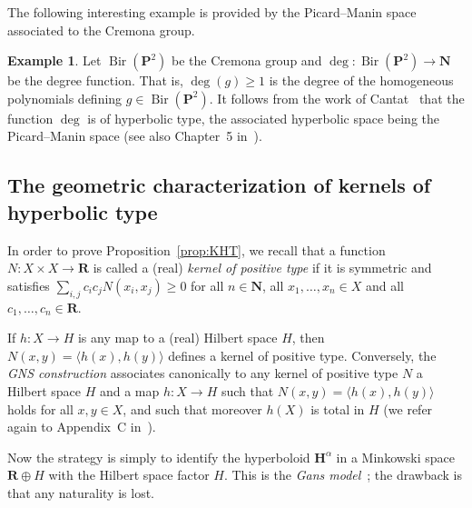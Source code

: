 \documentclass[11pt]{article}
\theoremstyle{definition}
\newtheorem{exam}[theo]{Example}
\numberwithin{equation}{section}
\numberwithin{figure}{section}
\numberwithin{table}{section}
\DeclareMathOperator{\Bir}{Bir}
\newcommand{\sH}{H}
\newcommand{\RR}{\mathbf{R}}
\newcommand{\NN}{\mathbf{N}}
\newcommand{\HH}{\mathbf{H}}
\begin{document}
The following interesting example is provided by the Picard--Manin space associated to the Cremona group.

\begin{exam}\label{ex:PM}
Let $\Bir(\mathbf{P}^{2})$ be the Cremona group and $\deg \colon \Bir(\mathbf{P}^{2}) \to \mathbf{N}$ be the degree function. That is, $\deg(g)\geq 1$ is the degree of the homogeneous polynomials defining $g\in \Bir(\mathbf{P}^{2})$. It follows from the work of Cantat~\cite{Cantat} that the function $\deg$ is of hyperbolic type, the associated hyperbolic space being the Picard--Manin space (see also Chapter~5 in~\cite{Manin}).
\end{exam}


\subsection{The geometric characterization of kernels of hyperbolic type}\label{sec:KHT-KPT}

In order to prove Proposition~\ref{prop:KHT}, we recall that a function $N\colon X\times X\to\RR$ is called a (real) \emph{kernel of positive type} if it is symmetric and satisfies $\sum_{i,j} c_i c_j N(x_i, x_j)\geq 0$ for all $n\in \NN$, all $x_1, \ldots, x_n\in X$ and all $c_1, \ldots, c_n\in \RR$.

If $h\colon X\to \sH$ is any map to a (real) Hilbert space $\sH$, then $N(x,y)=\langle h(x), h(y)\rangle$ defines a kernel of positive type. Conversely, the \emph{GNS construction} associates canonically to any kernel of positive type $N$ a Hilbert space $\sH$ and a map $h\colon X\to \sH$ such that $N(x,y)=\langle h(x), h(y)\rangle$ holds for all $x,y\in X$, and such that moreover $h(X)$ is total in $\sH$ (we refer again to Appendix~C in~\cite{Bekka-Harpe-Valette}).

Now the strategy is simply to identify the hyperboloid $\HH^\alpha$ in a Minkowski space $\RR\oplus \sH$ with the Hilbert space factor $\sH$. This is the \emph{Gans model}~\cite{Gans66}; the drawback is that any naturality is lost.
\end{document}
